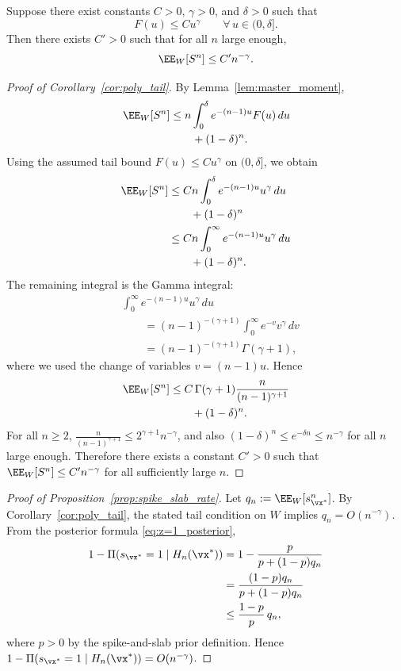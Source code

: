\begin{corollary}\label{cor:poly_tail}
Suppose there exist constants $C>0$, $\gamma>0$, and $\delta>0$ such that
\[
F(u) \le C u^\gamma \qquad \forall\, u \in (0,\delta].
\]
Then there exists $C'>0$ such that for all $n$ large enough,
\[
\EE_W[S^n] \le C' n^{-\gamma}.
\]
\end{corollary}
\label{proof:cor_poly_tail}
\begin{proof}[Proof of Corollary~\ref{cor:poly_tail}]
By Lemma~\ref{lem:master_moment},
\[
\begin{aligned}
\EE_W[S^n]
&\le n\int_0^\delta e^{-(n-1)u}F(u)\,du\\
&\qquad{}+(1-\delta)^n.
\end{aligned}
\]
Using the assumed tail bound $F(u)\le C u^\gamma$ on $(0,\delta]$, we obtain
\[
\begin{aligned}
\EE_W[S^n]
&\le Cn\int_0^\delta e^{-(n-1)u}u^\gamma\,du\\
&\qquad{}+(1-\delta)^n\\
&\le Cn\int_0^\infty e^{-(n-1)u}u^\gamma\,du\\
&\qquad{}+(1-\delta)^n.
\end{aligned}
\]
The remaining integral is the Gamma integral:
\[
\begin{aligned}
&\int_0^\infty e^{-(n-1)u}u^\gamma\,du\\
&\qquad=(n-1)^{-(\gamma+1)}
\int_0^\infty e^{-v}v^\gamma\,dv\\
&\qquad=(n-1)^{-(\gamma+1)}\Gamma(\gamma+1),
\end{aligned}
\]
where we used the change of variables $v=(n-1)u$. Hence
\[
\begin{aligned}
\EE_W[S^n]
&\le C\,\Gamma(\gamma+1)
\frac{n}{(n-1)^{\gamma+1}}\\
&\qquad{}+(1-\delta)^n.
\end{aligned}
\]
For all $n\ge 2$, $\frac{n}{(n-1)^{\gamma+1}}\le 2^{\gamma+1}n^{-\gamma}$, and also
$(1-\delta)^n\le e^{-\delta n}\le n^{-\gamma}$ for all $n$ large enough. Therefore there exists
a constant $C'>0$ such that $\EE_W[S^n]\le C' n^{-\gamma}$ for all sufficiently large $n$.
\end{proof}

\label{proof:spike_slab_rate}
\propSpikeSlabRate*
\begin{proof}[Proof of Proposition~\ref{prop:spike_slab_rate}]
Let $q_n:=\EE_W[s_{\vx^*}^n]$. By Corollary~\ref{cor:poly_tail}, the stated
tail condition on $W$ implies $q_n=O(n^{-\gamma})$. From the posterior formula
\eqref{eq:z=1_posterior},
\[
\begin{aligned}
1-\Pi(s_{\vx^*}=1\mid H_n(\vx^*))
&=1-\frac{p}{p+(1-p)q_n}\\
&=\frac{(1-p)q_n}{p+(1-p)q_n}\\
&\le \frac{1-p}{p}\,q_n,
\end{aligned}
\]
where $p>0$ by the spike-and-slab prior definition. Hence
$1-\Pi(s_{\vx^*}=1\mid H_n(\vx^*))=O(n^{-\gamma})$.
\end{proof}

